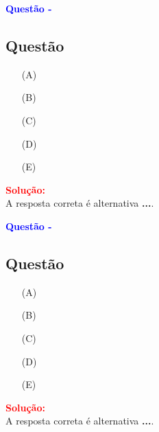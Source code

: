 \begin{flushleft}
\textbf{\textcolor{blue}{\Large Quest\~ao - }}\\
\noindent

\subsection{Quest\~ao }

\begin{itemize}
\item[(A)] 
\item[(B)] 
\item[(C)]
\item[(D)] 
\item[(E)] 
\end{itemize}

\vspace{0.5cm}

\textcolor{red}{\textbf{Solução:}}\\


A resposta correta é alternativa \colorbox{green!50}{\textbf{...}}.
\end{flushleft}

\begin{flushleft}
\textbf{\textcolor{blue}{\Large Quest\~ao - }}\\
\noindent

\subsection{Quest\~ao }

\begin{itemize}
\item[(A)] 
\item[(B)] 
\item[(C)]
\item[(D)] 
\item[(E)] 
\end{itemize}

\vspace{0.5cm}

\textcolor{red}{\textbf{Solução:}}\\


A resposta correta é alternativa \colorbox{green!50}{\textbf{...}}.
\end{flushleft}


